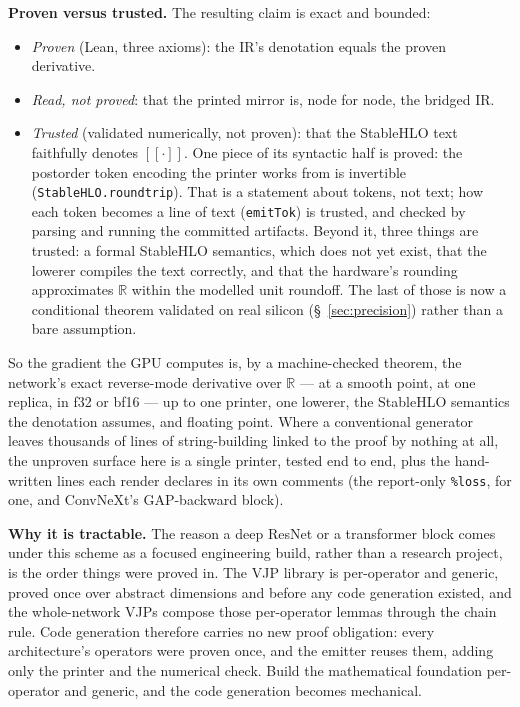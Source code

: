 \medskip\noindent\textbf{Proven versus trusted.} The resulting claim is exact
and bounded:
\begin{itemize}
  \item \emph{Proven} (Lean, three axioms): the IR's denotation equals the
    proven derivative.
  \item \emph{Read, not proved}: that the printed mirror is, node for node,
    the bridged IR.
  \item \emph{Trusted} (validated numerically, not proven): that the
    StableHLO text faithfully denotes $[\![\cdot]\!]$. One piece of
    its syntactic half is proved: the postorder token encoding the printer
    works from is invertible (\texttt{StableHLO.roundtrip}). That is a
    statement about tokens, not text; how each token becomes a line of text
    (\texttt{emitTok}) is trusted, and checked by parsing and running the
    committed artifacts. Beyond it, three things are trusted: a formal
    StableHLO semantics, which does not yet exist, that the lowerer
    compiles the text correctly, and that the hardware's rounding
    approximates $\mathbb{R}$ within the modelled unit roundoff. The last of those is now a conditional theorem validated on
    real silicon (\S~\ref{sec:precision}) rather than a bare assumption.
\end{itemize}
So the gradient the GPU computes is, by a machine-checked theorem, the
network's exact reverse-mode derivative over $\mathbb{R}$ --- at a smooth
point, at one replica, in f32 or bf16 --- up to one
printer, one lowerer, the StableHLO semantics the denotation assumes, and
floating point. Where a conventional generator leaves
thousands of lines of string-building linked to the proof by nothing at all,
the unproven surface here is a single printer, tested end to end, plus
the hand-written lines each render declares in its own comments (the
report-only \texttt{\%loss}, for one, and ConvNeXt's GAP-backward block).

\medskip\noindent\textbf{Why it is tractable.} The reason a deep ResNet or a
transformer block comes under this scheme as a focused engineering build,
rather than a research project, is the order things were proved in. The VJP
library is per-operator and generic, proved once over abstract
dimensions and before any code generation existed, and the whole-network VJPs
compose those per-operator lemmas through the chain rule. Code generation
therefore carries no new proof obligation: every architecture's
operators were proven once, and the emitter reuses them, adding only the
printer and the numerical check. Build the mathematical foundation
per-operator and generic, and the code generation becomes mechanical.

